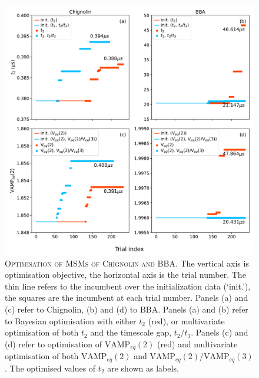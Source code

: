 \documentclass[journal=jacsat,manuscript=article]{achemso}
\begin{document}
\begin{figure}[h]
    \centering
    \includegraphics[width=\columnwidth]{results3/optimisation_summary.pdf}
    \caption{\textsc{Optimisation of MSMs of Chignolin and BBA}. The vertical axis is optimisation objective, the horizontal axis is the trial number. The thin line refers to the incumbent over the initialization data (`init.'), the squares are the incumbent at each trial number. Panels (a) and (c) refer to Chignolin, (b) and (d) to BBA. Panels (a) and (b) refer to Bayesian optimisation with either $t_{2}$  (red), or multivariate optimisation of both $t_{2}$ and the timescale gap, $t_{2}/t_{3}$.  Panels (c) and (d) refer to optimisation of  $\mathrm{VAMP}_{eq}(2)$ (red) and multivariate optimisation of both  $\mathrm{VAMP}_{eq}(2)$ and $\mathrm{VAMP}_{eq}(2)/\mathrm{VAMP}_{eq}(3)$. The optimised values of $t_2$ are shown as labels. }
    \label{fig:optimisation_trials}
\end{figure}
\end{document}
